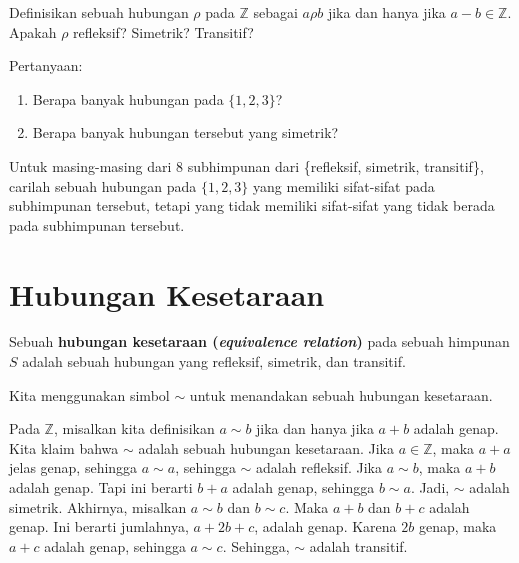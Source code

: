 \begin{exc}
Definisikan sebuah hubungan $\rho$ pada $\mathbb{Z}$ sebagai $a \rho b$ jika dan hanya jika $a-b \in \mathbb{Z}$. Apakah $\rho$ refleksif? Simetrik? Transitif?
\end{exc}

\begin{exc}Pertanyaan:
\begin{enumerate}
    \item Berapa banyak hubungan pada $\{1, 2, 3\}$?
    \item Berapa banyak hubungan tersebut yang simetrik?
\end{enumerate}
\end{exc}

\begin{exc}
Untuk masing-masing dari 8 subhimpunan dari \{refleksif, simetrik, transitif\}, carilah sebuah hubungan pada $\{1,2,3\}$ yang memiliki sifat-sifat pada subhimpunan tersebut, tetapi yang tidak memiliki sifat-sifat yang tidak berada pada subhimpunan tersebut.
\end{exc}


\section{Hubungan Kesetaraan}

\begin{defn}
Sebuah \textbf{hubungan kesetaraan (\textit{equivalence relation})} pada sebuah himpunan $S$ adalah sebuah hubungan yang refleksif, simetrik, dan transitif.
\end{defn}

Kita menggunakan simbol $\sim$ untuk menandakan sebuah hubungan kesetaraan.

\begin{exmp}
\label{exmp1.12}
Pada $\mathbb{Z}$, misalkan kita definisikan $a \sim b$ jika dan hanya jika $a+b$ adalah genap. Kita klaim bahwa $\sim$ adalah sebuah hubungan kesetaraan. Jika $a \in \mathbb{Z}$, maka $a+a$ jelas genap, sehingga $a \sim a$, sehingga $\sim$ adalah refleksif. Jika $a \sim b$, maka $a + b$ adalah genap. Tapi ini berarti $b + a$ adalah genap, sehingga $b \sim a$. Jadi, $\sim$ adalah simetrik. Akhirnya, misalkan $a \sim b$ dan $b\sim c$. Maka $a + b$ dan $b+c$ adalah genap. Ini berarti jumlahnya, $a + 2b + c$, adalah genap. Karena $2b$ genap, maka $a + c$ adalah genap, sehingga $a \sim c$. Sehingga, $\sim$ adalah transitif.
\end{exmp}

